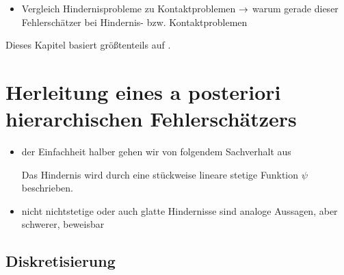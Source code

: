 \label{kap:4}

\begin{itemize}
\item Vergleich Hindernisprobleme zu Kontaktproblemen $\rightarrow$ warum gerade dieser Fehlerschätzer bei Hindernis- bzw. Kontaktproblemen
\end{itemize}

Dieses Kapitel basiert größtenteils auf \cite{ZouVee}.


\section{Herleitung eines a posteriori hierarchischen Fehlerschätzers}
\label{kap:4.1}

\begin{itemize}
\item der Einfachheit halber gehen wir von folgendem Sachverhalt aus
\begin{vor}
Das Hindernis  wird durch eine stückweise lineare stetige Funktion $\psi$ beschrieben.
\end{vor}

\item nicht nichtstetige oder auch glatte Hindernisse sind analoge Aussagen, aber schwerer, beweisbar
\end{itemize}






\subsection{Diskretisierung}
\label{kap:4.1.1}

